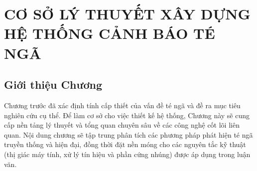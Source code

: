 \chapter[CƠ SỞ LÝ THUYẾT]{CƠ SỞ LÝ THUYẾT XÂY DỰNG HỆ THỐNG CẢNH BÁO TÉ NGÃ} 
\label{chap:theoretical_basis} %

\section*{Giới thiệu Chương} %
Chương trước đã xác định tính cấp thiết của vấn đề té ngã và đề ra mục tiêu nghiên cứu cụ thể. Để làm cơ sở cho việc thiết kế hệ thống, Chương này sẽ cung cấp nền tảng lý thuyết và tổng quan chuyên sâu về các công nghệ cốt lõi liên quan. Nội dung chương sẽ tập trung phân tích các phương pháp phát hiện té ngã truyền thống và hiện đại, đồng thời đặt nền móng cho các nguyên tắc kỹ thuật (thị giác máy tính, xử lý tín hiệu và phần cứng nhúng) được áp dụng trong luận văn.







